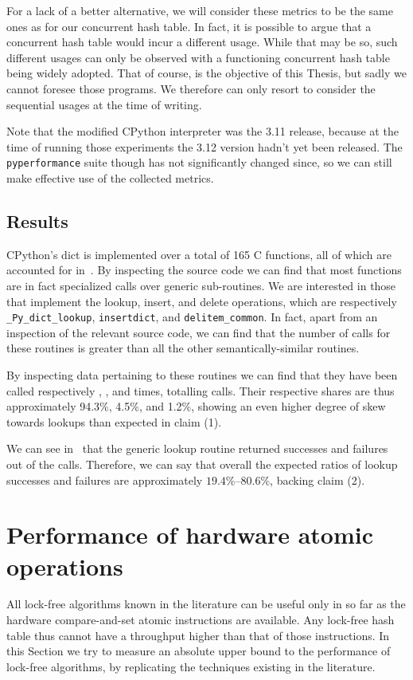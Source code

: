 For a lack of a better alternative, we will consider these metrics to be the same ones as for our concurrent hash table.
In fact, it is possible to argue that a concurrent hash table would incur a different usage.
While that may be so, such different usages can only be observed with a functioning concurrent hash table being widely adopted.
That of course, is the objective of this Thesis, but sadly we cannot foresee those programs.
We therefore can only resort to consider the sequential usages at the time of writing.

Note that the modified CPython interpreter was the 3.11 release, because at the time of running those experiments the 3.12 version hadn't yet been released.
The \texttt{pyperformance} suite though has not significantly changed since, so we can still make effective use of the collected metrics.

\subsection{Results}\label{subsec:dict-metrics-results}

CPython's dict is implemented over a total of 165 C functions, all of which are accounted for in~\cite{dict-metrics}.
By inspecting the source code we can find that most functions are in fact specialized calls over generic sub-routines.
We are interested in those that implement the lookup, insert, and delete operations, which are respectively \texttt{\_Py\_dict\_lookup}, \texttt{insertdict}, and \texttt{delitem\_common}.
In fact, apart from an inspection of the relevant source code, we can find that the number of calls for these routines is greater than all the other semantically-similar routines.

By inspecting data pertaining to these routines we can find that they have been called respectively , , and  times, totalling  calls.
Their respective shares are thus approximately 94.3\%, 4.5\%, and 1.2\%, showing an even higher degree of skew towards lookups than expected in claim (1).

We can see in~\cite{dict-metrics} that the generic lookup routine returned  successes and  failures out of the  calls.
Therefore, we can say that overall the expected ratios of lookup successes and failures are approximately ${19.4}\%$--${80.6}\%$, backing claim (2).


\section{Performance of hardware atomic operations}\label{sec:performance-of-hardware-atomic-operations}

\cite{cas-costs}

All lock-free algorithms known in the literature can be useful only in so far as the hardware compare-and-set atomic instructions are available.
Any lock-free hash table thus cannot have a throughput higher than that of those instructions.
In this Section we try to measure an absolute upper bound to the performance of lock-free algorithms, by replicating the techniques existing in the literature.
